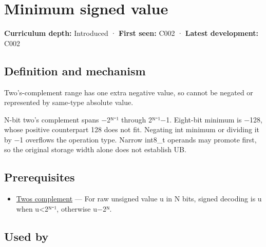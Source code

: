 \hypertarget{appendix-05f39b10364d}{}\label{referencestart:appendix-05f39b10364d}
\section{Minimum signed value}\label{appendix-05f39b10364d-minimum-signed-value}

\hypertarget{appendix-05f39b10364d-minimum-signed-value}{}

\textbf{Curriculum depth:} Introduced · \textbf{First seen:} C002 · \textbf{Latest development:} C002

\begin{allmightroledefinition}

\subsection{Definition and mechanism}\label{appendix-05f39b10364d-definition-and-mechanism}

\hypertarget{appendix-05f39b10364d-definition-and-mechanism}{}

Two's-complement range has one extra negative value, so  cannot be negated or represented by same-type absolute value.

\end{allmightroledefinition}

N-bit two's complement spans −2ᴺ⁻¹ through 2ᴺ⁻¹−1. Eight-bit minimum is −128, whose positive counterpart 128 does not fit. Negating int minimum or dividing it by −1 overflows the operation type. Narrow int8\_t operands may promote first, so the original storage width alone does not establish UB.

\subsection{Prerequisites}\label{appendix-05f39b10364d-prerequisites}

\hypertarget{appendix-05f39b10364d-prerequisites}{}

\begin{itemize}
\tightlist
\item
  \hyperref[appendix-4fbc03d20829]{Two\textquotesingle s complement} --- For raw unsigned value u in N bits, signed decoding is u when u\textless2ᴺ⁻¹, otherwise u−2ᴺ.
\end{itemize}

\subsection{Used by}\label{appendix-05f39b10364d-used-by}

